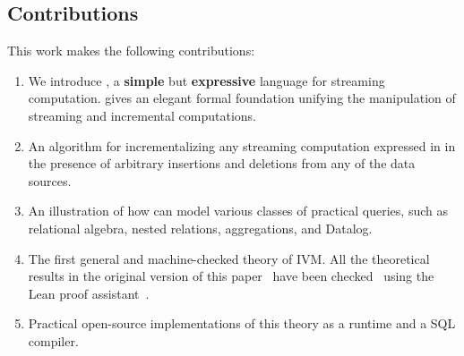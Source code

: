 \subsection{Contributions}

This work makes the following contributions:
\begin{enumerate}
  \item We introduce \dbsp, a \textbf{simple} but \textbf{expressive}
    language for streaming computation. \dbsp gives an elegant formal
    foundation unifying the manipulation of streaming and incremental
    computations.
  \item An algorithm for incrementalizing any streaming
    computation expressed in \dbsp in the presence of arbitrary
    insertions and deletions from any of the data sources.
  \item An illustration of how \dbsp can model various classes of
    practical queries, such as relational algebra, nested relations,
    aggregations, and Datalog.
  \item The first general and machine-checked theory of IVM.  All the
    theoretical results in the original version of this
    paper~\cite{budiu-vldb23} have been checked~\cite{dbsp-theory}
    using the Lean proof assistant~\cite{moura-cade15}.
  \item Practical open-source implementations of this theory as a
    runtime and a SQL compiler.
\end{enumerate}

